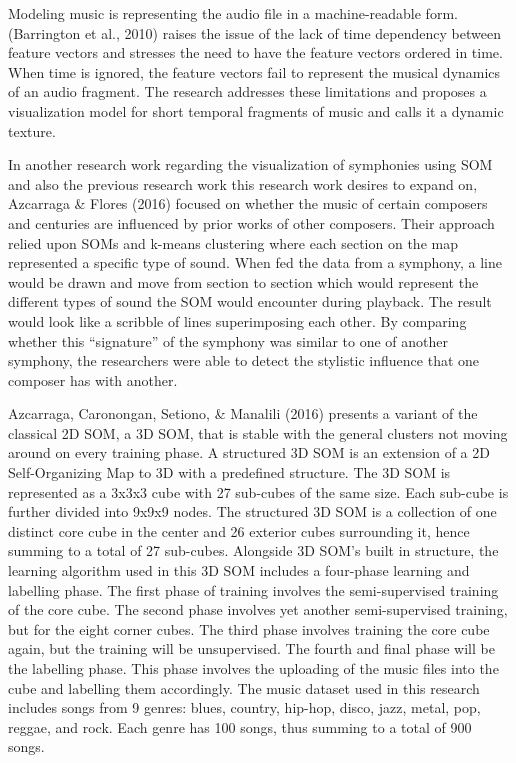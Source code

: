 Modeling music is representing the audio file in a machine-readable form. (Barrington et al., 2010) raises the issue of the lack of time dependency between feature vectors and stresses the need to have the feature vectors ordered in time. When time is ignored, the feature vectors fail to represent the musical dynamics of an audio fragment. The research addresses these limitations and proposes a visualization model for short temporal fragments of music and calls it a dynamic texture.

In another research work regarding the visualization of symphonies using SOM and also the previous research work this research work desires to expand on, Azcarraga \& Flores (2016) focused on whether the music of certain composers and centuries are influenced by prior works of other composers. Their approach relied upon SOMs and k-means clustering where each section on the map represented a specific type of sound. When fed the data from a symphony, a line would be drawn and move from section to section which would represent the different types of sound the SOM would encounter during playback. The result would look like a scribble of lines superimposing each other. By comparing whether this “signature” of the symphony was similar to one of another symphony, the researchers were able to detect the stylistic influence that one composer has with another.

	Azcarraga, Caronongan, Setiono, \& Manalili (2016) presents a variant of the classical 2D SOM, a 3D SOM, that is stable with the general clusters not moving around on every training phase. A structured 3D SOM is an extension of a 2D Self-Organizing Map to 3D with a predefined structure. The 3D SOM is represented as a 3x3x3 cube with 27 sub-cubes of the same size. Each sub-cube is further divided into 9x9x9 nodes. The structured 3D SOM is a collection of one distinct core cube in the center and 26 exterior cubes surrounding it, hence summing to a total of 27 sub-cubes. Alongside 3D SOM's built in structure, the learning algorithm used in this 3D SOM includes a four-phase learning and labelling phase. The first phase of training involves the semi-supervised training of the core cube. The second phase involves yet another semi-supervised training, but for the eight corner cubes. The third phase involves training the core cube again, but the training will be unsupervised. The fourth and final phase will be the labelling phase. This phase involves the uploading of the music files into the cube and labelling them accordingly. The music dataset used in this research includes songs from 9 genres: blues, country, hip-hop, disco, jazz, metal, pop, reggae, and rock. Each genre has 100 songs, thus summing to a total of 900 songs.

